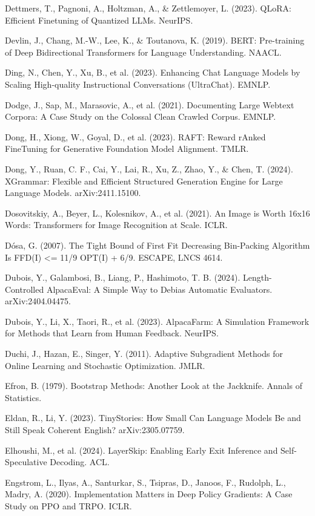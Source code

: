 {\begin{enumerate}[leftmargin=*,itemsep=1pt,label={[\arabic*]}]
\item Dettmers, T., Pagnoni, A., Holtzman, A., \& Zettlemoyer, L. (2023). QLoRA: Efficient Finetuning of Quantized LLMs. NeurIPS.
\item Devlin, J., Chang, M.-W., Lee, K., \& Toutanova, K. (2019). BERT: Pre-training of Deep Bidirectional Transformers for Language Understanding. NAACL.
\item Ding, N., Chen, Y., Xu, B., et al. (2023). Enhancing Chat Language Models by Scaling High-quality Instructional Conversations (UltraChat). EMNLP.
\item Dodge, J., Sap, M., Marasovic, A., et al. (2021). Documenting Large Webtext Corpora: A Case Study on the Colossal Clean Crawled Corpus. EMNLP.
\item Dong, H., Xiong, W., Goyal, D., et al. (2023). RAFT: Reward rAnked FineTuning for Generative Foundation Model Alignment. TMLR.
\item Dong, Y., Ruan, C. F., Cai, Y., Lai, R., Xu, Z., Zhao, Y., \& Chen, T. (2024). XGrammar: Flexible and Efficient Structured Generation Engine for Large Language Models. arXiv:2411.15100.
\item Dosovitskiy, A., Beyer, L., Kolesnikov, A., et al. (2021). An Image is Worth 16x16 Words: Transformers for Image Recognition at Scale. ICLR.
\item Dósa, G. (2007). The Tight Bound of First Fit Decreasing Bin-Packing Algorithm Is FFD(I) <= 11/9 OPT(I) + 6/9. ESCAPE, LNCS 4614.
\item Dubois, Y., Galambosi, B., Liang, P., Hashimoto, T. B. (2024). Length-Controlled AlpacaEval: A Simple Way to Debias Automatic Evaluators. arXiv:2404.04475.
\item Dubois, Y., Li, X., Taori, R., et al. (2023). AlpacaFarm: A Simulation Framework for Methods that Learn from Human Feedback. NeurIPS.
\item Duchi, J., Hazan, E., Singer, Y. (2011). Adaptive Subgradient Methods for Online Learning and Stochastic Optimization. JMLR.
\item Efron, B. (1979). Bootstrap Methods: Another Look at the Jackknife. Annals of Statistics.
\item Eldan, R., Li, Y. (2023). TinyStories: How Small Can Language Models Be and Still Speak Coherent English? arXiv:2305.07759.
\item Elhoushi, M., et al. (2024). LayerSkip: Enabling Early Exit Inference and Self-Speculative Decoding. ACL.
\item Engstrom, L., Ilyas, A., Santurkar, S., Tsipras, D., Janoos, F., Rudolph, L., Madry, A. (2020). Implementation Matters in Deep Policy Gradients: A Case Study on PPO and TRPO. ICLR.

\end{enumerate}}

